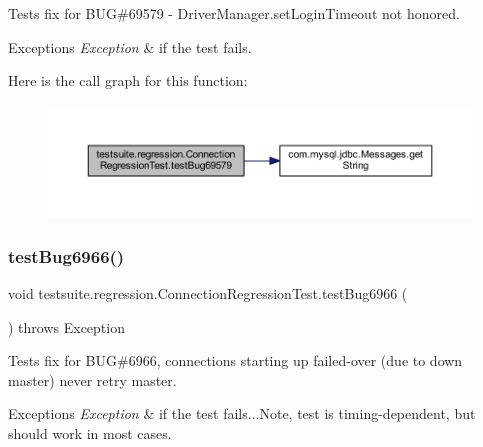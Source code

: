 Tests fix for B\+UG\#69579 -\/ Driver\+Manager.\+set\+Login\+Timeout not honored.


\begin{DoxyExceptions}{Exceptions}
{\em Exception} & if the test fails. \\
\hline
\end{DoxyExceptions}
Here is the call graph for this function\+:
\nopagebreak
\begin{figure}[H]
\begin{center}
\leavevmode
\includegraphics[width=350pt]{classtestsuite_1_1regression_1_1_connection_regression_test_a09e5aef6835aa4e8cf07bde4c3d06a28_cgraph}
\end{center}
\end{figure}
\mbox{\label{classtestsuite_1_1regression_1_1_connection_regression_test_ad40619b88e8c45d0c604f376a8d0fd91}} 
\subsubsection{\texorpdfstring{test\+Bug6966()}{testBug6966()}}
{\footnotesize\ttfamily void testsuite.\+regression.\+Connection\+Regression\+Test.\+test\+Bug6966 (\begin{DoxyParamCaption}{ }\end{DoxyParamCaption}) throws Exception}

Tests fix for B\+UG\#6966, connections starting up failed-\/over (due to down master) never retry master.


\begin{DoxyExceptions}{Exceptions}
{\em Exception} & if the test fails...Note, test is timing-\/dependent, but should work in most cases. \\
\hline
\end{DoxyExceptions}
\mbox{\label{classtestsuite_1_1regression_1_1_connection_regression_test_adeeac09d039c69e054e676529af26ca7}} 
